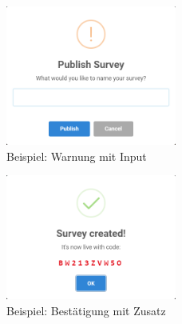 \begin{figure}[H]
	\centering
	\includegraphics[width=0.5\textwidth, keepaspectratio]{img/guide/Publish.png}
	\captionsetup{justification=centering, format=plain}
	\caption[Meldung: Warnung mit Input]{Beispiel: Warnung mit Input \\\quelleScreenshot}
	\label{fig:warn}
\end{figure}

\begin{figure}[H]
	\centering
	\includegraphics[width=0.5\textwidth, keepaspectratio]{img/guide/Published.png}
	\captionsetup{justification=centering, format=plain}
	\caption[Meldung: Bestätigung mit Zusatz]{Beispiel: Bestätigung mit Zusatz \\\quelleScreenshot}
	\label{fig:special}
\end{figure}

